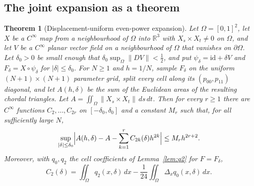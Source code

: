 \documentclass[11pt]{article}
\newtheorem{theorem}{Theorem}
\theoremstyle{remark}
\newcommand{\R}{\mathbb{R}}
\begin{document}
\subsection{The joint expansion as a theorem}\label{sec:jointthm}
\begin{theorem}[Displacement-uniform even-power expansion]\label{thm:joint}
Let $\Omega=[0,1]^2$, let $X$ be a $C^\infty$ map from a neighbourhood of $\Omega$ into $\R^3$
with $X_s\times X_t\neq0$ on $\Omega$, and let $V$ be a $C^\infty$ planar vector field on a
neighbourhood of $\Omega$ that vanishes on $\partial\Omega$. Let $\delta_0>0$ be small enough
that $\delta_0\sup_\Omega\|DV\|<\tfrac12$, and put $\psi_\delta=\mathrm{id}+\delta V$ and
$F_\delta=X\circ\psi_\delta$ for $|\delta|\le\delta_0$. For $N\ge1$ and $h=1/N$, sample
$F_\delta$ on the uniform $(N+1)\times(N+1)$ parameter grid, split every cell along its
$(p_{00},p_{11})$ diagonal, and let $A(h,\delta)$ be the sum of the Euclidean areas of the
resulting chordal triangles. Let $A=\iint_\Omega\|X_s\times X_t\|\,ds\,dt$. Then for every
$r\ge1$ there are $C^\infty$ functions $C_2,\dots,C_{2r}$ on $[-\delta_0,\delta_0]$ and a
constant $M_r$ such that, for all sufficiently large $N$,
\begin{equation}\label{eq:jointthm}
\sup_{|\delta|\le\delta_0}\Bigl|A(h,\delta)-A-\sum_{k=1}^{r}C_{2k}(\delta)h^{2k}\Bigr|
\le M_rh^{2r+2}.
\end{equation}
Moreover, with $q_0,q_2$ the cell coefficients of Lemma~\ref{lem:q2} for $F=F_\delta$,
\begin{equation}\label{eq:C2formula}
C_2(\delta)=\iint_\Omega q_2(x,\delta)\,dx-\frac1{24}\iint_\Omega\Delta_xq_0(x,\delta)\,dx .
\end{equation}
\end{theorem}
\end{document}
